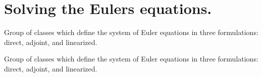 \hypertarget{group__Euler__Equations}{}\section{Solving the Euler\textquotesingle{}s equations.}
\label{group__Euler__Equations}


Group of classes which define the system of Euler equations in three formulations\+: direct, adjoint, and linearized.  


Group of classes which define the system of Euler equations in three formulations\+: direct, adjoint, and linearized. 

